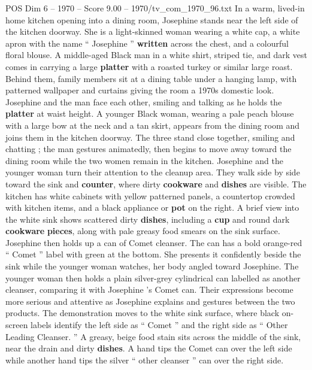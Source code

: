 \begin{textsample}{POS Dim 6 – 1970 – Score 9.00 – 1970/tv\_com\_1970\_96.txt}  \label{ex:f6_pos_048}
In a warm, lived-in home kitchen opening into a dining room, Josephine stands near the left side of the kitchen doorway.
She is a light-skinned woman wearing a white cap, a white apron with the name “ Josephine ” \textbf{written} across the chest, and a colourful floral blouse.
A middle-aged Black man in a white shirt, striped tie, and dark vest comes in carrying a large \textbf{platter} with a roasted turkey or similar large roast.
Behind them, family members sit at a dining table under a hanging lamp, with patterned wallpaper and curtains giving the room a 1970s domestic look.
Josephine and the man face each other, smiling and talking as he holds the \textbf{platter} at waist height.
A younger Black woman, wearing a pale peach blouse with a large bow at the neck and a tan skirt, appears from the dining room and joins them in the kitchen doorway.
The three stand close together, smiling and chatting ; the man gestures animatedly, then begins to move away toward the dining room while the two women remain in the kitchen.
Josephine and the younger woman turn their attention to the cleanup area.
They walk side by side toward the sink and \textbf{counter}, where dirty \textbf{cookware} and \textbf{dishes} are visible.
The kitchen has white cabinets with yellow patterned panels, a countertop crowded with kitchen items, and a black appliance or \textbf{pot} on the right.
A brief view into the white sink shows scattered dirty \textbf{dishes}, including a \textbf{cup} and round dark \textbf{cookware} \textbf{pieces}, along with pale greasy food smears on the sink surface.
Josephine then holds up a can of Comet cleanser.
The can has a bold orange-red “ Comet ” label with green at the bottom.
She presents it confidently beside the sink while the younger woman watches, her body angled toward Josephine.
The younger woman then holds a plain silver-grey cylindrical can labelled as another cleanser, comparing it with Josephine ’s Comet can.
Their expressions become more serious and attentive as Josephine explains and gestures between the two products.
The demonstration moves to the white sink surface, where black on-screen labels identify the left side as “ Comet ” and the right side as “ Other Leading Cleanser. ” A greasy, beige food stain sits across the middle of the sink, near the drain and dirty \textbf{dishes}.
A hand tips the Comet can over the left side while another hand tips the silver “ other cleanser ” can over the right side.

\end{textsample}
